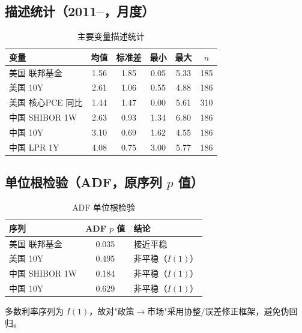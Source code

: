 \documentclass[12pt,a4paper]{ctexart}
\begin{document}
\subsection{描述统计（2011--，月度）}
\begin{table}[H]\centering\caption{主要变量描述统计}\small
\begin{tabular}{l ccccc}
\toprule
变量 & 均值 & 标准差 & 最小 & 最大 & $n$ \\
\midrule
美国 联邦基金 & 1.56 & 1.85 & 0.05 & 5.33 & 185 \\
美国 10Y & 2.61 & 1.06 & 0.55 & 4.88 & 186 \\
美国 核心PCE 同比 & 1.44 & 1.47 & 0.00 & 5.61 & 310 \\
中国 SHIBOR 1W & 2.63 & 0.93 & 1.34 & 6.80 & 186 \\
中国 10Y & 3.10 & 0.69 & 1.62 & 4.55 & 186 \\
中国 LPR 1Y & 4.08 & 0.75 & 3.00 & 5.77 & 186 \\
\bottomrule
\end{tabular}\end{table}

\subsection{单位根检验（ADF，原序列 \texorpdfstring{$p$}{p} 值）}
\begin{table}[H]\centering\caption{ADF 单位根检验}\small
\begin{tabular}{l c l}
\toprule
序列 & ADF $p$ 值 & 结论 \\
\midrule
美国 联邦基金 & 0.035 & 接近平稳 \\
美国 10Y & 0.495 & 非平稳（$I(1)$） \\
中国 SHIBOR 1W & 0.184 & 非平稳（$I(1)$） \\
中国 10Y & 0.629 & 非平稳（$I(1)$） \\
\bottomrule
\end{tabular}\end{table}
多数利率序列为 $I(1)$，故对"政策$\to$市场"采用协整/误差修正框架，避免伪回归。
\end{document}
